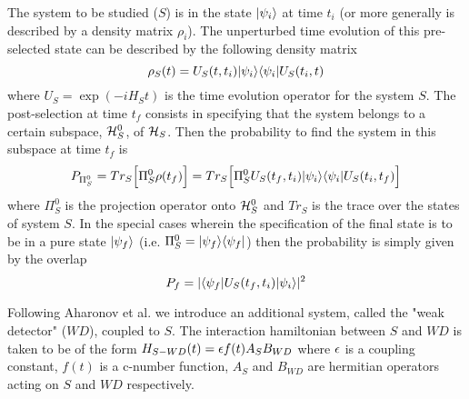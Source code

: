 \documentclass[12pt]{article}
\begin{document}
The system to be studied ($S$) is in the state $\mbox{$ \mbox{$ \vert \psi_i \rangle $} $}$ at
time $t_i$ (or
 more generally is described by a density matrix $\rho_i$).
The unperturbed time
evolution of this pre-selected state
 can be described by the following density matrix
\begin{equation} \rho_S(t) = U_S(t,t_i)\mbox{$ \mbox{$ \vert \psi_i \rangle $} $} \mbox{$ \mbox{$ \langle \psi_i \vert $} $} U_S(t_i,t) \label{weaki}
\end{equation}  where $U_S = \exp (- i H_S t)$ is the time evolution operator
for the system $S$. The post-selection at time $t_f$ consists in specifying
that the system belongs to a certain subspace, ${\cal H}_S^{0}$, of
${\cal H}_S$.
Then the probability to find the system in
this subspace at time $t_f$ is \begin{equation}
P_{\Pi_S^{0}} = Tr_S \Bigl [ \Pi_S^{0} \rho(t_f) \Bigr] = Tr_S \Bigl[
\Pi_S^{0} U_S(t_f,t_i)\mbox{$ \mbox{$ \vert \psi_i \rangle $} $} \mbox{$ \mbox{$ \langle \psi_i \vert $} $} U_S(t_i,t_f) \Bigr] \label{weakii}
\end{equation}   where
$\Pi_S^{0}$ is the projection operator onto ${\cal H}_S^0$ and $Tr_S$ is
the trace over the states of system $S$.
In the special cases wherein the specification
of the final state is to be in a pure state $\mbox{$ \vert \psi_f \rangle $}$ (i.e.
$\Pi_S^0=\mbox{$ \vert \psi_f \rangle $}\mbox{$ \langle \psi_f \vert $}$)
then the probability is simply given by the overlap
\begin{equation}
P_{f}= \vert \mbox{$ \langle \psi_f \vert $} U_S(t_f,t_i)\mbox{$ \vert \psi_i \rangle $}\vert^2
\end{equation}

Following Aharonov et al. we introduce an additional system, called the "weak
detector" ($WD$), coupled to $S$.
The
interaction hamiltonian between $S$ and $WD$ is taken to be of the form
$H_{S-WD} (t) = \mbox{$ \epsilon $} f(t) A_S B_{WD}$ where $\mbox{$ \epsilon $}$ is a coupling constant,
$f(t)$ is a c-number function, $A_S$ and $B_{WD}$ are hermitian operators
acting
on $S$ and $WD$ respectively.
\end{document}
